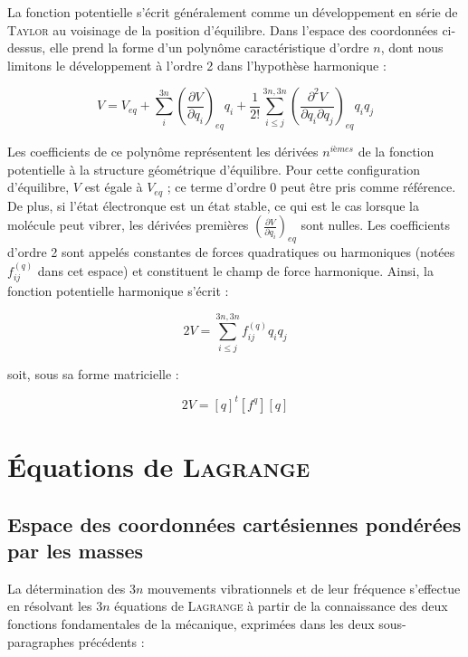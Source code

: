 La fonction potentielle s'écrit généralement comme un développement en série de \textsc{Taylor} au voisinage de la position d'équilibre. Dans l'espace des coordonnées ci-dessus, elle prend la forme d'un polynôme caractéristique d'ordre $n$, dont nous limitons le développement à l'ordre 2 dans l'hypothèse harmonique :

\begin{equation}
	V = V_{eq} + \sum^{3n}_i\left(\frac{\partial V}{\partial q_i}\right)_{eq} q_i + \frac{1}{2!} \sum^{3n,3n}_{i\leq j}\left(\frac {\partial^2 V}{\partial q_i \partial q_j}\right)_{eq} q_iq_j
\end{equation}

 Les coefficients de ce polynôme représentent les dérivées $n^{ièmes}$ de la fonction potentielle à la structure géométrique d'équilibre. Pour cette configuration d'équilibre, $V$ est égale à $V_{eq}$ ; ce terme d'ordre 0 peut être pris comme référence. De plus, si l'état électronque est un état stable, ce qui est le cas lorsque la molécule peut vibrer, les dérivées premières $\left(\frac{\partial V}{\partial q_i}\right)_{eq}$ sont nulles. Les coefficients d'ordre 2 sont appelés constantes de forces quadratiques ou harmoniques (notées $f^{(q)}_{ij}$ dans cet espace) et constituent le champ de force harmonique.
Ainsi, la fonction potentielle harmonique s'écrit :

\begin{equation}
	2V = \sum^{3n,3n}_{i\leq j} f^{(q)}_{ij} q_iq_j
\end{equation}

\noindent soit, sous sa forme matricielle :

\begin{equation}
	2V = \left[q\right]^t\left[ f^q\right]\left[q\right]
\end{equation}


\section{Équations de \textsc{Lagrange}}

\subsection{Espace des coordonnées cartésiennes pondérées par les masses}\label{esp_pond_masse}
 La détermination des $3n$ mouvements vibrationnels et de leur fréquence s'effectue en résolvant les $3n$ équations de \textsc{Lagrange} à partir de la connaissance des deux fonctions fondamentales de la mécanique, exprimées dans les deux sous-paragraphes précédents :
 

